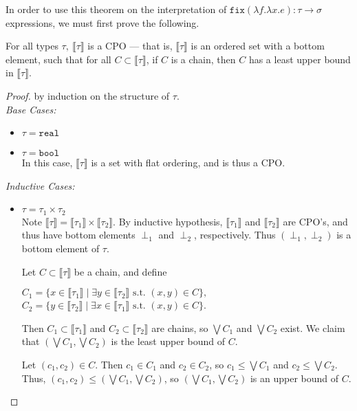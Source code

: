 In order to use this theorem on the interpretation of $\texttt{fix}(\lambda f. \lambda x.e): \tau \rightarrow \sigma$ expressions, 
we must first prove the following.
\begin{thm}
For all types $\tau, \ \llbracket \tau \rrbracket$ is a CPO --- that is, $\llbracket \tau \rrbracket$ is an ordered 
set with a bottom element, such that for all $ C \subset \llbracket \tau \rrbracket$, if  $C$ is a chain, then $C$ has a least 
upper bound in $\llbracket \tau \rrbracket$. 
\end{thm}
\begin{proof}
by induction on the structure of $\tau$. \\
\emph{Base Cases: }
\begin{itemize}
\item $\tau = \texttt{real}$
\item $\tau = \texttt{bool}$ \\
In this case, $\llbracket \tau \rrbracket$ is a set with flat ordering, and is thus a CPO. 
\end{itemize}
\emph{Inductive Cases: }
\begin{itemize}
\item $\tau = \tau_1 \times \tau_2$  \\
Note $\llbracket \tau \rrbracket = \llbracket \tau_1 \rrbracket \times \llbracket \tau_2 \rrbracket$. By inductive hypothesis,
$\llbracket \tau_1 \rrbracket$ and $\llbracket \tau_2 \rrbracket$ are CPO's, and thus have bottom elements $\perp_1$ and $
\perp_2$, respectively. Thus $(\perp_1, \perp_2)$ is a bottom element of $\tau$. 

Let $C \subset \llbracket \tau \rrbracket$ be a
chain, and define
\begin{center}
$C_1 = \{x \in \llbracket \tau_1 \rrbracket \mid \exists y \in \llbracket \tau_2 \rrbracket \text{ s.t. } (x,y) \in C\},$ \\
$C_2 = \{ y \in \llbracket \tau_2 \rrbracket\mid \exists x \in \llbracket \tau_1 \rrbracket \text{ s.t. } (x,y) \in C\}$. \\ 
\end{center}
Then $C_1 \subset \llbracket \tau_1 \rrbracket$ and $C_2 \subset \llbracket \tau_2 \rrbracket$ are chains, so $\bigvee C_1$
and $\bigvee C_2$ exist. We claim that $(\bigvee C_1, \bigvee C_2)$ is the least upper bound of $C$. 

Let $(c_1, c_2) \in C$. Then $c_1 \in C_1$ and $c_2 \in C_2$, so $c_1 \leq \bigvee C_1$ and $c_2 \leq \bigvee C_2$. Thus, 
$(c_1, c_2) \leq (\bigvee C_1, \bigvee C_2)$, so $(\bigvee C_1, \bigvee C_2)$ is an upper bound of $C$.


\end{itemize}
\end{proof}
